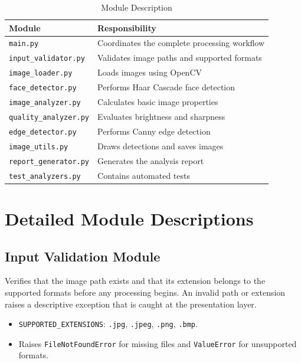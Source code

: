 \documentclass[11pt,a4paper]{article}
\begin{document}
\begin{table}[H]
\centering
\small
\renewcommand{\arraystretch}{1.25}
\begin{tabularx}{\textwidth}{p{4.6cm}X}
\toprule
\textbf{Module} & \textbf{Responsibility} \\
\midrule
\texttt{main.py} & Coordinates the complete processing workflow \\
\texttt{input\_validator.py} & Validates image paths and supported formats \\
\texttt{image\_loader.py} & Loads images using OpenCV \\
\texttt{face\_detector.py} & Performs Haar Cascade face detection \\
\texttt{image\_analyzer.py} & Calculates basic image properties \\
\texttt{quality\_analyzer.py} & Evaluates brightness and sharpness \\
\texttt{edge\_detector.py} & Performs Canny edge detection \\
\texttt{image\_utils.py} & Draws detections and saves images \\
\texttt{report\_generator.py} & Generates the analysis report \\
\texttt{test\_analyzers.py} & Contains automated tests \\
\bottomrule
\end{tabularx}
\caption{Module Description}
\label{tab:modules}
\end{table}

\section{Detailed Module Descriptions}

\subsection{Input Validation Module}
Verifies that the image path exists and that its extension belongs to the supported formats before any processing begins. An invalid path or extension raises a descriptive exception that is caught at the presentation layer.
\begin{itemize}[leftmargin=1.5em]
    \item \texttt{SUPPORTED\_EXTENSIONS}: \texttt{.jpg}, \texttt{.jpeg}, \texttt{.png}, \texttt{.bmp}.
    \item Raises \texttt{FileNotFoundError} for missing files and \texttt{ValueError} for unsupported formats.
\end{itemize}
\end{document}
